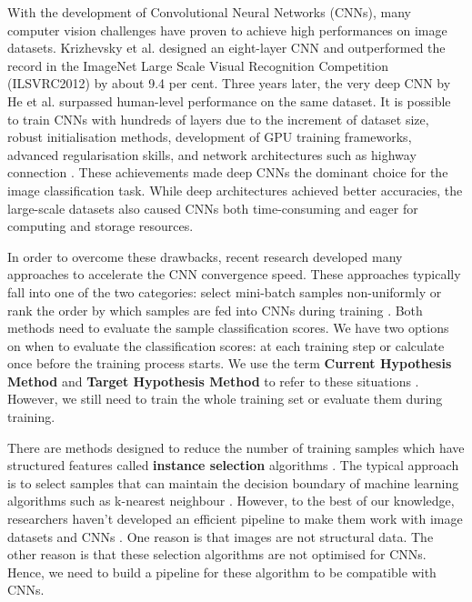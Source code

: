 With the development of Convolutional Neural Networks (CNNs), many computer vision challenges have proven to achieve high performances on image datasets. Krizhevsky et al. \cite{Krizhevsky2017} designed an eight-layer CNN and outperformed the record in the ImageNet Large Scale Visual Recognition Competition (ILSVRC2012) by about 9.4 per cent. Three years later, the very deep CNN by He et al. \cite{He, He2016} surpassed human-level performance on the same dataset. It is possible to train CNNs with hundreds of layers due to the increment of dataset size, robust initialisation methods, development of GPU training frameworks, advanced regularisation skills, and network architectures such as highway connection \cite{He2016, Huang2017}. These achievements made deep CNNs the dominant choice for the image classification task. While deep architectures achieved better accuracies, the large-scale datasets also caused CNNs both time-consuming and eager for computing and storage resources. 

In order to overcome these drawbacks, recent research developed many approaches to accelerate the CNN convergence speed. These approaches typically fall into one of the two categories: select mini-batch samples non-uniformly \cite{Shrivastava2016, Li2017, Katharopoulos2017, Chang2017} or rank the order by which samples are fed into CNNs during training \cite{Bengio2009, Hacohen2019a}. Both methods need to evaluate the sample classification scores. We have two options on when to evaluate the classification scores: at each training step or calculate once before the training process starts. We use the term \textbf{Current Hypothesis Method} and \textbf{Target Hypothesis Method} to refer to these situations \cite{Hacohen2019a}. However, we still need to train the whole training set or evaluate them during training. 

There are methods designed to reduce the number of training samples which have structured features called \textbf{instance selection} algorithms \cite{Olvera-Lopez2010, Aha1991, Brighton2002, Riquelme2003a}. The typical approach is to select samples that can maintain the decision boundary of machine learning algorithms such as k-nearest neighbour \cite{Malhat2020}. However, to the best of our knowledge, researchers haven't developed an efficient pipeline to make them work with image datasets and CNNs \cite{Sun2014, Albelwi2016}. One reason is that images are not structural data. The other reason is that these selection algorithms are not optimised for CNNs. Hence, we need to build a pipeline for these algorithm to be compatible with CNNs.

